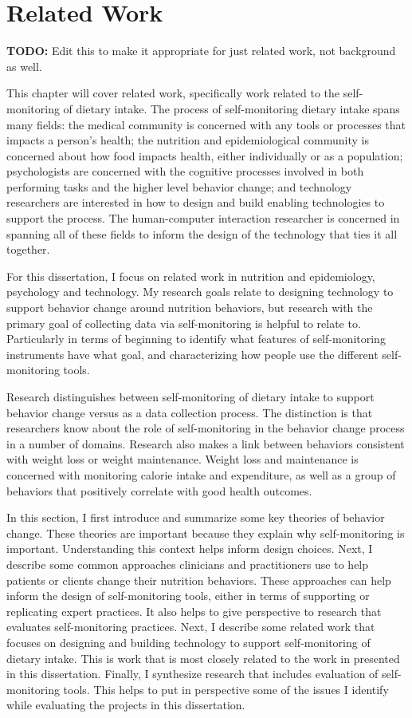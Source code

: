\chapter{Related Work}
\label{cha:relatedWork}

\textbf{TODO: }Edit this to make it appropriate for just related work, not background as well. 

This chapter will cover related work, specifically work related to the self-monitoring of dietary intake. The process of self-monitoring dietary intake spans many fields: the medical community is concerned with any tools or processes that impacts a person's health; the nutrition and epidemiological community is concerned about how food impacts health, either individually or as a population; psychologists are concerned with the cognitive processes involved in both performing tasks and the higher level behavior change; and technology researchers are interested in how to design and build enabling technologies to support the process. The human-computer interaction researcher is concerned in spanning all of these fields to inform the design of the technology that ties it all together. 

For this dissertation, I focus on related work in nutrition and epidemiology, psychology and technology. My research goals relate to designing technology to support behavior change around nutrition behaviors, but research with the primary goal of collecting data via self-monitoring is helpful to relate to. Particularly in terms of beginning to identify what features of self-monitoring instruments have what goal, and characterizing how people use the different self-monitoring tools. 

Research distinguishes between self-monitoring of dietary intake to support behavior change versus as a data collection process. The distinction is that researchers know about the role of self-monitoring in the behavior change process in a number of domains. Research also makes a link between behaviors consistent with weight loss or weight maintenance. Weight loss and maintenance is concerned with monitoring calorie intake and expenditure, as well as a group of behaviors that positively correlate with good health outcomes. 

In this section, I first introduce and summarize some key theories of behavior change. These theories are important because they explain why self-monitoring is important. Understanding this context helps inform design choices. Next, I describe some common approaches clinicians and practitioners use to help patients or clients change their nutrition behaviors. These approaches can help inform the design of self-monitoring tools, either in terms of supporting or replicating expert practices. It also helps to give perspective to research that evaluates self-monitoring practices. Next, I describe some related work that focuses on designing and building technology to support self-monitoring of dietary intake. This is work that is most closely related to the work in presented in this dissertation. Finally, I synthesize research that includes evaluation of self-monitoring tools. This helps to put in perspective some of the issues I identify while evaluating the projects in this dissertation.


